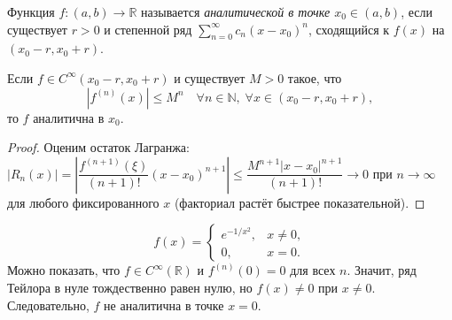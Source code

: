
\begin{defn}
  Функция $f: (a,b) \to \mathbb{R}$ называется \emph{аналитической в точке $x_0 \in (a,b)$},
  если существует $r > 0$ и степенной ряд $\sum_{n=0}^\infty c_n(x-x_0)^n$,
  сходящийся к $f(x)$ на $(x_0-r, x_0+r)$.
\end{defn}

\begin{theorem}
  Если $f \in C^\infty(x_0-r, x_0+r)$ и существует $M > 0$ такое, что
  \[
    |f^{(n)}(x)| \leq M^n \quad\forall n \in \mathbb{N},\; \forall x \in (x_0-r, x_0+r),
  \]
  то $f$ аналитична в $x_0$.
  \begin{proof}
    Оценим остаток Лагранжа:
    $|R_n(x)| = \left|\dfrac{f^{(n+1)}(\xi)}{(n+1)!}(x-x_0)^{n+1}\right|
    \leq \dfrac{M^{n+1}|x-x_0|^{n+1}}{(n+1)!} \to 0$
    при $n\to\infty$ для любого фиксированного $x$ (факториал растёт быстрее показательной). \qedhere
  \end{proof}
\end{theorem}

\begin{example}
  \[
    f(x) = \begin{cases} e^{-1/x^2}, & x \neq 0, \\ 0, & x = 0. \end{cases}
  \]
  Можно показать, что $f \in C^\infty(\mathbb{R})$ и $f^{(n)}(0) = 0$ для всех $n$.
  Значит, ряд Тейлора в нуле тождественно равен нулю, но $f(x) \neq 0$ при $x \neq 0$.
  Следовательно, $f$ не аналитична в точке $x = 0$.
\end{example}

